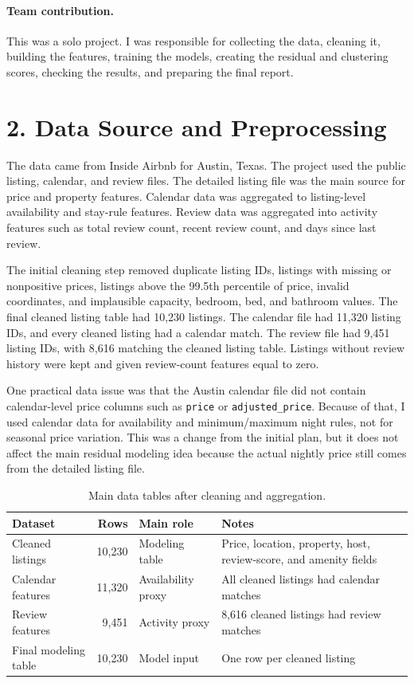 \documentclass[11pt]{article}
\begin{document}
\paragraph{Team contribution.} This was a solo project. I was responsible for collecting the data, cleaning it, building the features, training the models, creating the residual and clustering scores, checking the results, and preparing the final report.

\section*{2. Data Source and Preprocessing}

The data came from Inside Airbnb for Austin, Texas. The project used the public listing, calendar, and review files. The detailed listing file was the main source for price and property features. Calendar data was aggregated to listing-level availability and stay-rule features. Review data was aggregated into activity features such as total review count, recent review count, and days since last review.

The initial cleaning step removed duplicate listing IDs, listings with missing or nonpositive prices, listings above the 99.5th percentile of price, invalid coordinates, and implausible capacity, bedroom, bed, and bathroom values. The final cleaned listing table had 10,230 listings. The calendar file had 11,320 listing IDs, and every cleaned listing had a calendar match. The review file had 9,451 listing IDs, with 8,616 matching the cleaned listing table. Listings without review history were kept and given review-count features equal to zero.

One practical data issue was that the Austin calendar file did not contain calendar-level price columns such as \texttt{price} or \texttt{adjusted\_price}. Because of that, I used calendar data for availability and minimum/maximum night rules, not for seasonal price variation. This was a change from the initial plan, but it does not affect the main residual modeling idea because the actual nightly price still comes from the detailed listing file.

\begin{table}[H]
\centering
\caption{Main data tables after cleaning and aggregation.}
\small
\begin{tabular}{L{0.20\textwidth}rL{0.18\textwidth}L{0.42\textwidth}}
\toprule
Dataset & Rows & Main role & Notes \\
\midrule
Cleaned listings & 10,230 & Modeling table & Price, location, property, host, review-score, and amenity fields \\
Calendar features & 11,320 & Availability proxy & All cleaned listings had calendar matches \\
Review features & 9,451 & Activity proxy & 8,616 cleaned listings had review matches \\
Final modeling table & 10,230 & Model input & One row per cleaned listing \\
\bottomrule
\end{tabular}
\end{table}
\end{document}
